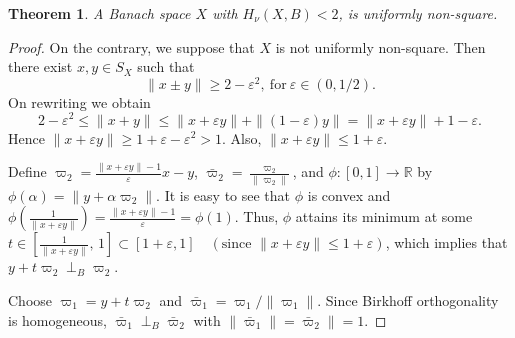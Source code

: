 \documentclass[preprint,12pt]{elsarticle}
\newtheorem{theorem}{Theorem}[section]
\numberwithin{equation}{section}
\begin{document}
\begin{theorem}\label{t11}
A Banach space $X$ with $H_\nu(X,B)< 2$,  is uniformly non-square.
\end{theorem}
\begin{proof}
On the contrary, we suppose that $X$ is not uniformly non-square.
Then there exist $x,y \in S_X$ such that
\[
\|x \pm y\| \ge 2-\varepsilon^2, ~\text{for}~ \varepsilon \in (0,1/2).
\]
On rewriting we obtain
\[
2-\varepsilon^2 \le \|x+y\|
\le \|x+\varepsilon y\| + \|(1-\varepsilon)y\|
= \|x+\varepsilon y\| + 1-\varepsilon.
\]
Hence
$\|x+\varepsilon y\| \ge 1+\varepsilon-\varepsilon^2 > 1$. Also, $\|x+\varepsilon y\|\leq 1+\varepsilon$.

Define $\varpi_2=\frac{\|x+\varepsilon y\|-1}{\varepsilon}x-y$, 
$\bar \varpi_2=\frac{\varpi_2}{\|\varpi_2\|}$,
and $\phi:[0,1]\to\mathbb{R}$ by $\phi(\alpha)=\|y+\alpha \varpi_2\|$.
It is easy to see that $\phi$ is convex and 
$\phi\!\left(\frac{1}{\|x+\varepsilon y\|}\right)
=\frac{\|x+\varepsilon y\|-1}{\varepsilon}
=\phi(1)$.
Thus, $\phi$ attains its minimum at some
$t\in\left[\frac{1}{\|x+\varepsilon y\|},\,1\right]
\subset\left[{1+\varepsilon},1\right]
\quad (\text{since } \|x+\varepsilon y\|\le 1+\varepsilon)$,
which implies that $y+t \varpi_2 \perp_B \varpi_2$.

Choose $\varpi_1=y+t \varpi_2$ and $\bar \varpi_1=\varpi_1/\|\varpi_1\|$.
Since Birkhoff orthogonality is homogeneous, $\bar \varpi_1\perp_B \bar \varpi_2$ with $\|\bar \varpi_1\|=\bar \varpi_2\|=1$.


\end{proof}
\end{document}
